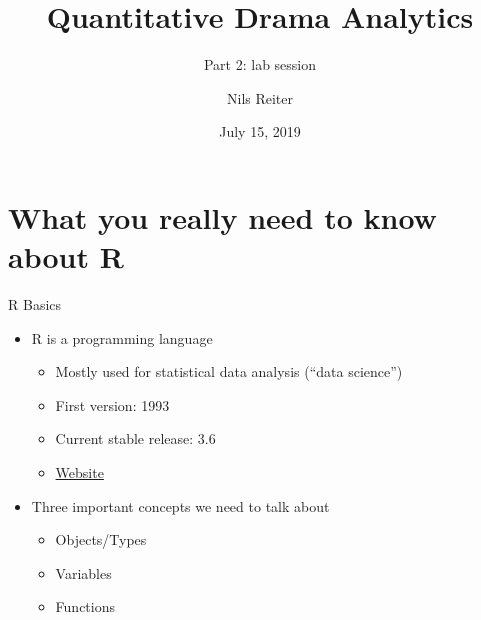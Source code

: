\documentclass[ignorenonframetext,]{beamer}
\title{Quantitative Drama Analytics}
\subtitle{Part 2: lab session}
\author{Nils Reiter}
\date{July 15, 2019}
\providecommand{\tightlist}{%
  \setlength{\itemsep}{0pt}\setlength{\parskip}{0pt}}
\begin{document}
\frame{\titlepage}

\hypertarget{what-you-really-need-to-know-about-r}{%
\section{What you really need to know about
R}\label{what-you-really-need-to-know-about-r}}

\begin{frame}{R Basics}
\protect\hypertarget{r-basics}{}

\begin{itemize}
\tightlist
\item
  R is a programming language

  \begin{itemize}
  \tightlist
  \item
    Mostly used for statistical data analysis (``data science'')
  \item
    First version: 1993
  \item
    Current stable release: 3.6
  \item
    \href{https://www.r-project.org/}{Website}
  \end{itemize}
\item
  Three important concepts we need to talk about

  \begin{itemize}
  \tightlist
  \item
    Objects/Types
  \item
    Variables
  \item
    Functions
  \end{itemize}
\end{itemize}

\end{frame}
\end{document}
